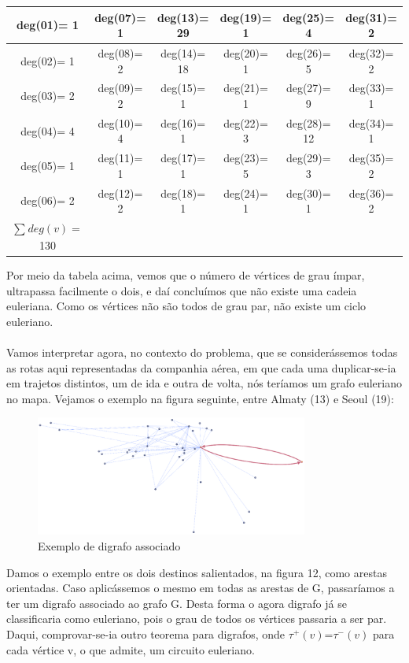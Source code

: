 \begin{center}
    \begin{tabular}{ |c|c|c|c|c|c| } 
     \hline
     deg(01)= 1 & deg(07)= 1 & deg(13)= 29 & deg(19)= 1 & deg(25)= 4 & deg(31)= 2\\
     \hline
     deg(02)= 1 & deg(08)= 2 & deg(14)= 18 & deg(20)= 1 & deg(26)= 5 & deg(32)= 2\\
     \hline
     deg(03)= 2 & deg(09)= 2 & deg(15)= 1 & deg(21)= 1 & deg(27)= 9 & deg(33)= 1\\
     \hline
     deg(04)= 4 & deg(10)= 4 & deg(16)= 1 & deg(22)= 3 & deg(28)= 12 & deg(34)= 1\\
     \hline
     deg(05)= 1 & deg(11)= 1 & deg(17)= 1 & deg(23)= 5 & deg(29)= 3 & deg(35)= 2\\
     \hline
     deg(06)= 2 & deg(12)= 2 & deg(18)= 1 & deg(24)= 1 & deg(30)= 1 & deg(36)= 2\\ 
     \hline
     $\sum_{}^{}deg(v)=$130 &   &   &   &   & \\
     \hline
    \end{tabular}
\end{center}

\indent Por meio da tabela acima, vemos que o número de vértices de grau ímpar, ultrapassa facilmente o dois, e 
daí concluímos que não existe uma cadeia euleriana. Como os vértices não são todos de grau par, não existe 
um ciclo euleriano.\\
\\
\indent Vamos interpretar agora, no contexto do problema, que se considerássemos todas as rotas aqui 
representadas da companhia aérea, em que cada uma duplicar-se-ia em trajetos distintos, um de ida e outra
de volta, nós teríamos um grafo euleriano no mapa.
Vejamos o exemplo na figura seguinte, entre Almaty (13) e Seoul (19):\\
\begin{figure}[h]
    \centering
    \includegraphics[width=0.8\textwidth]{imgs/Figura12}
    \caption{Exemplo de digrafo associado\label{fig:imagem12}}
\end{figure}
\indent Damos o exemplo entre os dois destinos salientados, na figura 12, como arestas orientadas. Caso 
aplicássemos o mesmo em todas as arestas de G, passaríamos a ter um digrafo associado ao grafo G. Desta 
forma o agora digrafo já se classificaria como euleriano, pois o grau de todos os vértices passaria a ser par.
Daqui, comprovar-se-ia outro teorema para digrafos, onde $\tau^+(v)$=$\tau^-(v)$
para cada vértice v, o que admite, um circuito euleriano.\\
   
